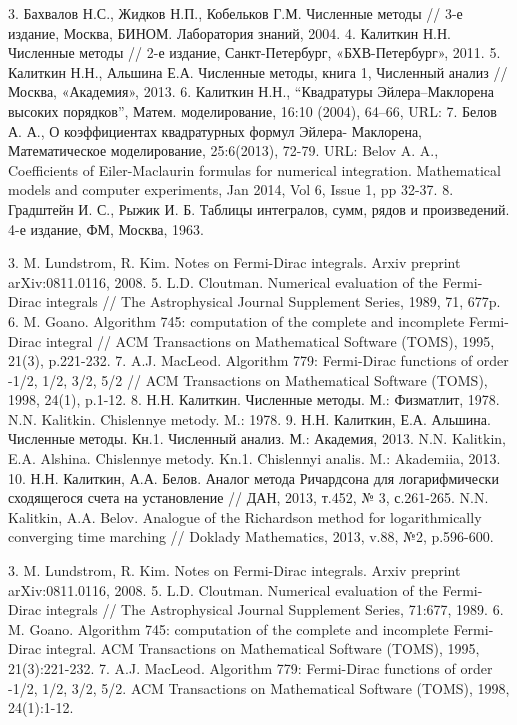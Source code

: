 3. Бахвалов Н.С., Жидков Н.П., Кобельков Г.М. Численные методы // 3-е
издание, Москва, БИНОМ. Лаборатория знаний, 2004.
4. Калиткин Н.Н. Численные методы // 2-е издание, Санкт-Петербург,
«БХВ-Петербург», 2011.
5. Калиткин Н.Н., Альшина Е.А. Численные методы, книга 1, Численный
анализ // Москва, «Академия», 2013.
6. Калиткин Н.Н., “Квадратуры Эйлера–Маклорена высоких порядков”,
Матем. моделирование, 16:10 (2004), 64–66, URL:
7. Белов А. А., О коэффициентах квадратурных формул Эйлера-
Маклорена, Математическое моделирование, 25:6(2013), 72-79. URL:
Belov A. A., Coefficients of Eiler-Maclaurin formulas for numerical
integration. Mathematical models and computer experiments, Jan 2014, Vol 6, Issue
1, pp 32-37.
8. Градштейн И. С., Рыжик И. Б. Таблицы интегралов, сумм, рядов и произведений. 4-е издание, ФМ, Москва, 1963.

3. M. Lundstrom, R. Kim. Notes on Fermi-Dirac integrals. Arxiv preprint arXiv:0811.0116, 2008.
5. L.D. Cloutman. Numerical evaluation of the Fermi-Dirac integrals // The Astrophysical Journal
Supplement Series, 1989, 71, 677p.
6. M. Goano. Algorithm 745: computation of the complete and incomplete Fermi-Dirac integral //
ACM Transactions on Mathematical Software (TOMS), 1995, 21(3), p.221-232.
7. A.J. MacLeod. Algorithm 779: Fermi-Dirac functions of order -1/2, 1/2, 3/2, 5/2 // ACM Transactions
on Mathematical Software (TOMS), 1998, 24(1), p.1-12.
8. Н.Н. Калиткин. Численные методы. М.: Физматлит, 1978.
N.N. Kalitkin. Chislennye metody. M.: 1978.
9. Н.Н. Калиткин, Е.А. Альшина. Численные методы. Кн.1. Численный анализ. М.: Академия, 2013.
N.N. Kalitkin, E.A. Alshina. Chislennye metody. Kn.1. Chislennyi analis. M.: Akademiia, 2013.
10. Н.Н. Калиткин, А.А. Белов. Аналог метода Ричардсона для логарифмически сходящегося
счета на установление // ДАН, 2013, т.452, № 3, с.261-265.
N.N. Kalitkin, A.A. Belov. Analogue of the Richardson method for logarithmically converging time
marching // Doklady Mathematics, 2013, v.88, №2, p.596-600.

3. M. Lundstrom, R. Kim. Notes on Fermi-Dirac integrals. Arxiv preprint arXiv:0811.0116, 2008.
5. L.D. Cloutman. Numerical evaluation of the Fermi-Dirac integrals // The Astrophysical Journal
Supplement Series, 71:677, 1989.
6. M. Goano. Algorithm 745: computation of the complete and incomplete Fermi-Dirac integral.
ACM Transactions on Mathematical Software (TOMS), 1995, 21(3):221-232.
7. A.J. MacLeod. Algorithm 779: Fermi-Dirac functions of order -1/2, 1/2, 3/2, 5/2. ACM Transactions
on Mathematical Software (TOMS), 1998, 24(1):1-12.

